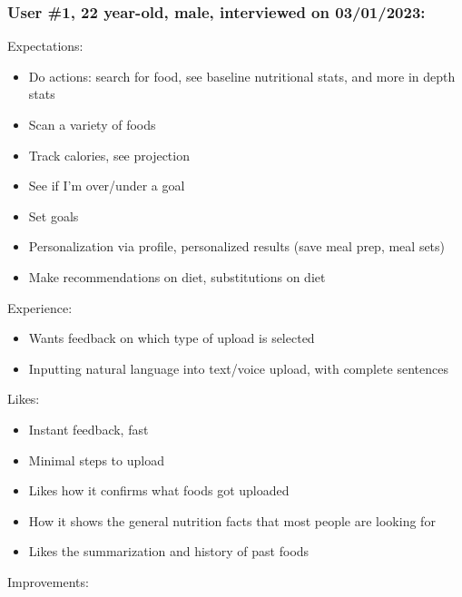 \documentclass[12pt, titlepage]{article}
\begin{document}
	\subsubsection*{User \#1, 22 year-old, male, interviewed on 03/01/2023:}	
	Expectations:
	\begin{itemize}
		\item Do actions: search for food, see baseline nutritional stats, and more in depth stats
		\item Scan a variety of foods
		\item Track calories, see projection
		\item See if I'm over/under a goal
		\item Set goals
		\item Personalization via profile, personalized results (save meal prep, meal sets)
		\item Make recommendations on diet, substitutions on diet
	\end{itemize}
	Experience:
	\begin{itemize}
		\item Wants feedback on which type of upload is selected
		\item Inputting natural language into text/voice upload, with complete sentences
	\end{itemize}
	Likes:
	\begin{itemize}
		\item Instant feedback, fast
		\item Minimal steps to upload
		\item Likes how it confirms what foods got uploaded
		\item How it shows the general nutrition facts that most people are looking for
		\item Likes the summarization and history of past foods
	\end{itemize}
	Improvements:
\end{document}

